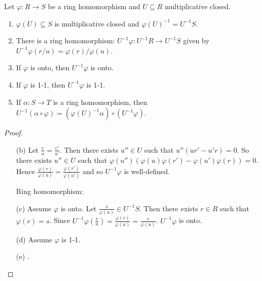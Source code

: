\begin{proposition}
    Let $\varphi: R \to S$ be a ring homomorphism and $U \subseteq R$ multiplicative closed.
    \begin{enumerate}
        \item $\varphi(U) \subseteq S$ is multiplicative closed and $\varphi(U)^{-1} = U^{-1}S$.
        \item There is a ring homomorphism: $U^{-1}\varphi: U^{-1}R \to U^{-1}S$ given by $U^{-1}\varphi(r/u) = \varphi(r)/\varphi(u)$.
            \begin{center}
            \end{center}
        \item If $\varphi$ is onto, then $U^{-1}\varphi$ is onto.
        \item If $\varphi$ is 1-1, then $U^{-1}\varphi$ is 1-1.
        \item If $\alpha: S \to T$ is a ring homomorphism, then $U^{-1}(\alpha \circ \varphi) = (\varphi(U)^{-1}\alpha) \circ (U^{-1}\varphi)$. 
            \begin{center}
                \begin{tikzcd}
                \end{tikzcd}
            \end{center}
    \end{enumerate}
\end{proposition}

\begin{proof}
    \begin{enumerate}
        \item [(b)] 
            Let $\frac{r}{u} = \frac{r'}{u'}$. Then there exists $u'' \in U$ such that $u''(ur'-u'r) = 0$. So there exists $u'' \in U$ such that $\varphi(u'')(\varphi(u)\varphi(r') - \varphi(u')\varphi(r)) = 0$. Hence $\frac{\varphi(r)}{\varphi(u)} = \frac{\varphi(r')}{\varphi(u')}$ and so $U^{-1}\varphi$ is well-defined. \par 
            Ring homomorphism: \par 
        \item [(c)]
            Assume $\varphi$ is onto. Let $\frac{s}{\varphi(u)} \in U^{-1}S$. Then there exists $r \in R$ such that $\varphi(r) = s$. Since $U^{-1}\varphi(\frac{r}{u}) = \frac{\varphi(r)}{\varphi(u)} = \frac{s}{\varphi(u)}$. $U^{-1}\varphi$ is onto.
        \item[(d)] Assume $\varphi$ is 1-1.
        \item[(e)] .
    \end{enumerate}
\end{proof}

